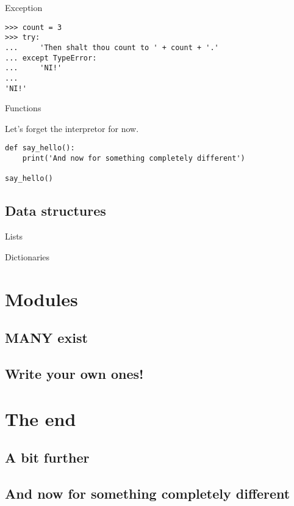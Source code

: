 \documentclass[ignorenonframetext,]{beamer}
\begin{document}
\begin{frame}[fragile]{Exception}
    \begin{verbatim}
>>> count = 3
>>> try:
...     'Then shalt thou count to ' + count + '.'
... except TypeError:
...     'NI!'
...
'NI!'
    \end{verbatim}
\end{frame}

\begin{frame}[fragile]{Functions}

    Let's forget the interpretor for now.

    \begin{verbatim}
def say_hello():
    print('And now for something completely different')

say_hello()
    \end{verbatim}
\end{frame}

\subsection{Data structures}
\begin{frame}{Lists}
\end{frame}

\begin{frame}{Dictionaries}
\end{frame}

\section{Modules}
\subsection{MANY exist}
\subsection{Write your own ones!}

\section{The end}
\subsection{A bit further}
\subsection{And now for something completely different}
\end{document}
